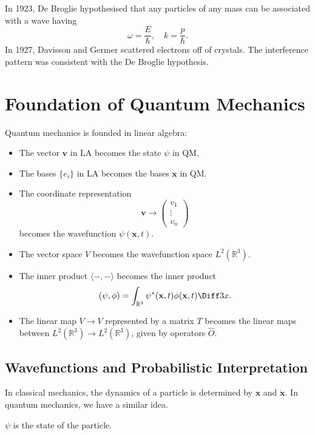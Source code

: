 \documentclass[12pt]{article}
\begin{document}
In 1923, De Broglie hypothesised that any particles of any mass can be associated with a wave having
\[
\omega = \frac{E}{\hbar}, \quad k = \frac{p}{\hbar}
.\]
In 1927, Davisson and Germer scattered electrons off of crystals. The interference pattern was consistent with the De Broglie hypothesis.

\newpage

\section{Foundation of Quantum Mechanics}%
\label{sec:foundation_of_quantum_mechanics}

Quantum mechanics is founded in linear algebra:

\begin{itemize}
	\item The vector $\mathbf{v}$ in LA becomes the state $\psi$ in QM.
	\item The bases $\{e_i\}$ in LA becomes the bases $\mathbf{x}$ in QM.
	\item The coordinate representation
		\[
		\mathbf{v} \to
		\begin{pmatrix}
			v_1 \\
			\vdots \\
			v_n
		\end{pmatrix}
		\]
		becomes the wavefunction $\psi(\mathbf{x}, t)$.
	\item The vector space $V$ becomes the wavefunction space $L^2(\mathbb{R}^3)$.
	\item The inner product $\langle -, - \rangle$ becomes the inner product
		\[
			(\psi, \phi) = \int_{\mathbb{R}^3} \psi^{\ast}(\mathbf{x}, t) \phi(\mathbf{x}, t)\Diff3 x
		.\]
	\item The linear map $V \to V$ represented by a matrix $T$ becomes the linear maps between $L^2(\mathbb{R}^3) \to L^2(\mathbb{R}^3)$, given by operators $\hat O$.
\end{itemize}

\subsection{Wavefunctions and Probabilistic Interpretation}%
\label{sub:wavefunctions_and_probabilistic_interpretation}

In classical mechanics, the dynamics of a particle is determined by $\mathbf{x}$ and $\mathbf{\dot x}$. In quantum mechanics, we have a similar idea.

\begin{definition}
	$\psi$ is the state of the particle.
\end{definition}
\end{document}

